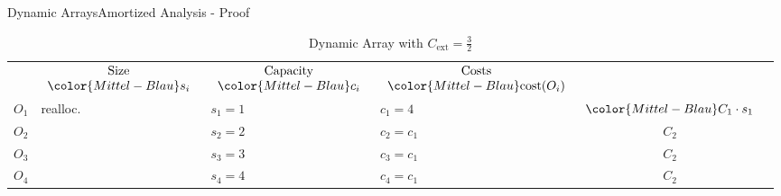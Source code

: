 
\begin{frame}{Dynamic Arrays}{Amortized Analysis - Proof}
  \vspace*{-1.0em}%
  \begin{table}[!h]%
    \caption{Dynamic Array with %
      $C_\text{ext} = \frac{3}{2}$}%
    \label{tab:amortized_analysis_limit}%
    \vspace*{-1.5em}%
    \begin{tabular}{|l|l|l|l|c|@{}l}
      \cmidrule[\heavyrulewidth]{1-5}\addlinespace[-\belowrulesep]
      \multicolumn{2}{|c|}{$\begin{array}{c}
          \text{Operation}\\
          \text{(append)}
        \end{array}$} &
      $\begin{array}{c}
        \text{Size}\\
        {\color{Mittel-Blau}s_i}
      \end{array}$ &
      $\begin{array}{c}
        \text{Capacity}\\
        {\color{Mittel-Blau}c_i}
      \end{array}$ &
      $\begin{array}{c}
        \text{Costs}\\
        {\color{Mittel-Blau}\mathrm{cost}(O_i)}
      \end{array}$\\
      \addlinespace[-0.25\aboverulesep]\cmidrule[\heavyrulewidth]{1-5}
      $O_1$ & {\color{Mittel-Blau}realloc.} &
      $s_1 = 1$ & {\color{Mittel-Blau}$c_1 = 4$} &
      ${\color{Mittel-Blau}C_1 \cdot s_1}$ &
      \raisebox{-0.5em}{\multirow{4}{*}{%
        $\left.\begin{array}{@{}l@{}}\\[4.5em]\end{array}\right\rbrace
        \begin{array}{@{}l@{}}
           \text{distance}\\
           4 \geq \left\lfloor\dfrac{{\color{Mittel-Blau}s_1}}{2}\right\rfloor
        \end{array}$%
      }}\\
      $O_2$ & {} & $s_2 = 2$ & $c_2 = c_1$ & $C_2$\\
      $O_3$ & {} & $s_3 = 3$ & $c_3 = c_1$ & $C_2$\\
      $O_4$ & {} & $s_4 = 4$ & $c_4 = c_1$ & $C_2$\\

\end{tabular}
\end{table}
\end{frame}
